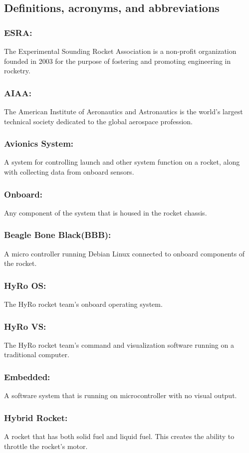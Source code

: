 \documentclass[10pt,draftclsnofoot,onecolumn,retainorgcmds]{IEEEtran}
\begin{document}
\subsection{Definitions, acronyms, and abbreviations}
\subsubsection{\bf ESRA:}  The Experimental Sounding Rocket Association is a non-profit organization founded in 2003 for the purpose of fostering and promoting engineering in rocketry.
\subsubsection{\bf AIAA:} The American Institute of Aeronautics and Astronautics is the world's largest technical society dedicated to the global aerospace profession.
\subsubsection{\bf Avionics System:}  A system for controlling launch and other system function on a rocket, along with collecting data from onboard sensors.
\subsubsection{\bf Onboard:} Any component of the system that is housed in the rocket chassis.
\subsubsection{\bf Beagle Bone Black(BBB):}   A micro controller running Debian Linux connected to onboard components of the rocket.
\subsubsection{\bf HyRo OS:}  The HyRo rocket team's onboard operating system.
\subsubsection{\bf HyRo VS:} The HyRo rocket team's command and visualization software running on a traditional computer.
\subsubsection{\bf Embedded:} A software system that is running on microcontroller with no visual output.
\subsubsection{\bf Hybrid Rocket:} A rocket that has both solid fuel and liquid fuel. This creates the ability to throttle the rocket's motor.
\end{document}

